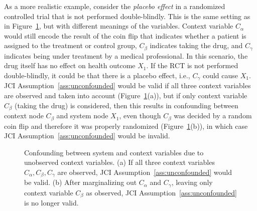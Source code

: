 \documentclass[twoside,11pt]{article}
\begin{document}
As a more realistic example, consider the \emph{placebo effect} in a randomized controlled trial that is not performed double-blindly. This is the same setting as in Figure~\ref{fig:unconfounded_invalid}, but with different meanings of the variables. Context variable $C_\alpha$ would still encode the result of the coin flip that indicates whether a patient is assigned to the treatment or control group, $C_\beta$ indicates taking the drug, and $C_\gamma$ indicates being under treatment by a medical professional. In this scenario, the drug itself has no effect on health outcome $X_1$. If the RCT is not performed double-blindly, it could be that there is a placebo effect, i.e., $C_\gamma$ could cause $X_1$. JCI Assumption~\ref{ass:unconfounded} would be valid if all three context variables are observed and taken into account (Figure~\ref{fig:unconfounded_invalid}(a)), but if only context variable $C_\beta$ (taking the drug) is considered, then this results in confounding between context node $C_\beta$ and system node $X_1$, even though $C_\beta$ was decided by a random coin flip and therefore it was properly randomized (Figure~\ref{fig:unconfounded_invalid}(b)), in which case JCI Assumption~\ref{ass:unconfounded} would be invalid.

\begin{figure}\centering%
  \caption{Confounding between system and context variables due to unobserved context variables. 
  (a) If all three context variables $C_\alpha, C_\beta, C_\gamma$ are observed, JCI Assumption~\ref{ass:unconfounded} would be valid. (b) After marginalizing out $C_\alpha$ and $C_\gamma$, leaving only context variable $C_\beta$ as observed, JCI Assumption~\ref{ass:unconfounded} is no longer valid.\label{fig:unconfounded_invalid}}
\end{figure}
\end{document}
